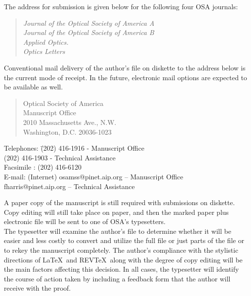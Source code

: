      The address for submission is given below for the following
four OSA journals:
\begin{quote}
  {\it  Journal of the Optical Society of America A \\
        Journal of the Optical Society of America B \\
        Applied Optics.                             \\
        Optics Letters                     \\        }
\end{quote}
Conventional mail delivery of
the author's file on diskette to the address below is the current
mode of receipt.  In the future, electronic mail options are
expected to be available as well.
 \begin{quote}
          Optical Society of America     \\
          Manuscript Office              \\
          2010 Massachusetts Ave., N.W.  \\
          Washington, D.C.  20036-1023   \\
 \end{quote}
\begin{tabbing}
       Telephones: \= (202) 416-1916 - Manuscript Office\\
                   \> (202) 416-1903 - Technical Assistance \\
       Facsimile : \> (202) 416-6120                 \\
       E-mail: \> (Internet) osamss@pinet.aip.org -- Manuscript Office\\
    \>  fharris@pinet.aip.org -- Technical Assistance %
\end{tabbing}

     A paper copy of the manuscript is still required with
submissions on diskette.  Copy editing will still take place on
paper, and then the marked paper plus electronic file will be
sent to one of OSA's typesetters. \\

     The typesetter will examine the author's file to determine
whether it will be easier and less costly to convert and utilize
the full file or just parts of the file or to rekey the
manuscript completely.  The author's compliance with the
stylistic directions of \LaTeX\ and REV\TeX\ along with the degree of
copy editing will be the main factors affecting this decision.
In all cases, the typesetter will identify the course of action
taken by including a feedback form that the author will receive
with the proof. \\

